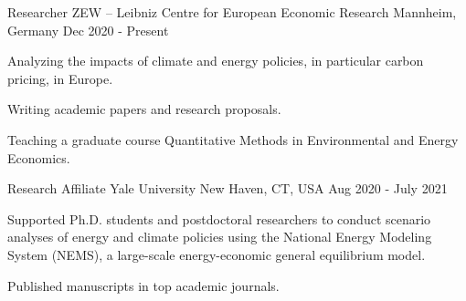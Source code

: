 

\begin{cventries}

    \cventry
    {Researcher} %
    {ZEW -- Leibniz Centre for European Economic Research} %
    {Mannheim, Germany} %
    {Dec 2020 - Present} %
    {
        \begin{cvitems} %
            \item {Analyzing the impacts of climate and energy policies, in particular carbon pricing, in Europe.}
            \item {Writing academic papers and research proposals.}
            \item {Teaching a graduate course Quantitative Methods in Environmental and Energy Economics.}
        \end{cvitems}
    }

    \cventry
    {Research Affiliate} %
    {Yale University} %
    {New Haven, CT, USA} %
    {Aug 2020 - July 2021} %
    {
        \begin{cvitems} %
            \item {Supported Ph.D. students and postdoctoral researchers to conduct scenario analyses of energy and climate policies using the National Energy Modeling System (NEMS), a large-scale energy-economic general equilibrium model.}
            \item {Published manuscripts in top academic journals.}
        \end{cvitems}
    }


\end{cventries}
